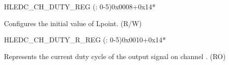 \begin{register}{H}{LEDC\_CH\_DUTY\_REG (: 0-5)}{0x0008+0x14*}\label{regdesc:LEDCCHNDUTYREG}
%
%
\regnewline%
\begin{regdesc}\begin{reglist}
\label{fielddesc:LEDCDUTYCHN}\item [LEDC\_DUTY\_CH\regindex{n}] Configures the initial value of Lpoint. (R/W)
\end{reglist}\end{regdesc}
\end{register}


\begin{register}{H}{LEDC\_CH\_DUTY\_R\_REG (: 0-5)}{0x0010+0x14*}\label{regdesc:LEDCCHNDUTYRREG}
%
%
\regnewline%
\begin{regdesc}\begin{reglist}
\label{fielddesc:LEDCDUTYCHNR}\item [LEDC\_DUTY\_CH\regindex{n}\_R] Represents the current duty cycle of the output signal on channel . (RO)
\end{reglist}\end{regdesc}
\end{register}


